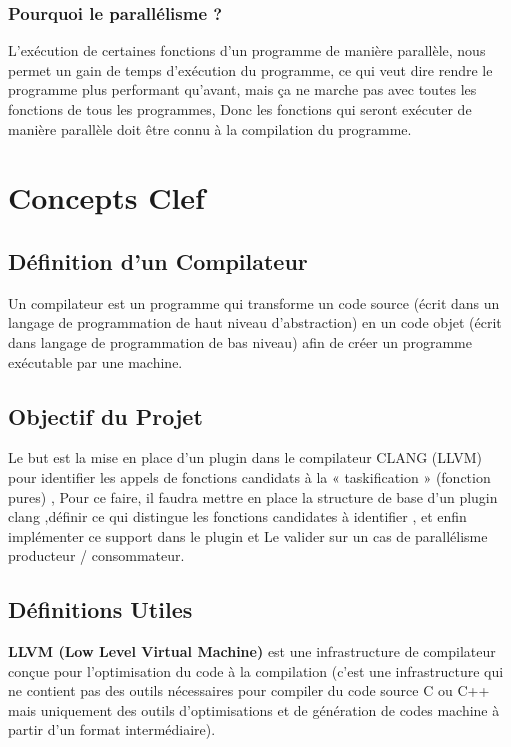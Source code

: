 \documentclass[12pt,titlepage]{article}
\begin{document}
\subsubsection{Pourquoi le parallélisme ?}

 L’exécution de  certaines fonctions d'un programme de manière parallèle, nous permet un gain de temps d'exécution du programme, ce qui veut dire rendre le programme plus performant qu'avant, mais ça ne marche pas avec toutes  les fonctions de tous les programmes, Donc  les fonctions qui seront exécuter de manière parallèle doit être connu à la compilation du programme.

\section{Concepts Clef}

\subsection{Définition d'un Compilateur} 

Un compilateur est un programme qui transforme un code source (écrit dans un langage de programmation de haut niveau d'abstraction) en un code objet (écrit dans langage de programmation de bas niveau) afin de créer un programme exécutable par une machine.

\subsection{Objectif du Projet}

Le but est la mise en place d’un plugin dans le compilateur CLANG (LLVM) pour identifier les appels de fonctions candidats à la « taskification » (fonction pures) , Pour ce faire, il faudra mettre en place la structure de base d’un plugin clang ,définir ce qui distingue les fonctions candidates à identifier , et enfin implémenter ce support dans le plugin et  Le valider sur un cas de parallélisme producteur / consommateur.


\subsection{Définitions Utiles} 
	

\textbf{ LLVM (Low Level Virtual Machine)} est une infrastructure de compilateur conçue pour l'optimisation du code à la compilation (c’est une infrastructure qui ne contient pas des outils nécessaires pour compiler du code source C ou C++ mais uniquement des outils d’optimisations et de génération de codes machine à partir d’un format intermédiaire).\cite{clangllvm}
              
\end{document}
